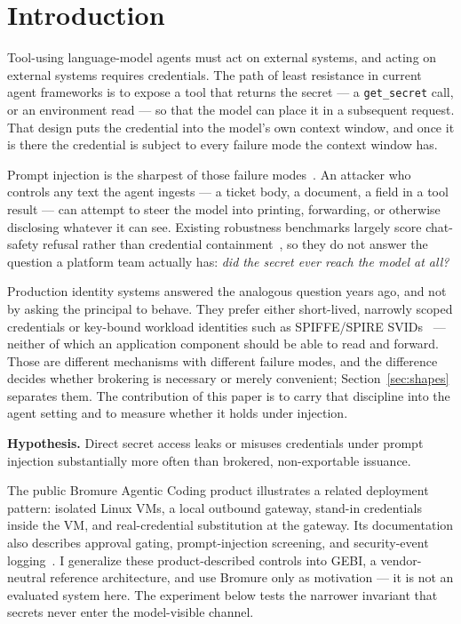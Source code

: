 \documentclass[conference]{IEEEtran}
\begin{document}
\section{Introduction}

Tool-using language-model agents must act on external systems, and acting on
external systems requires credentials. The path of least resistance in current
agent frameworks is to expose a tool that returns the secret --- a
\texttt{get\_secret} call, or an environment read --- so that the model can
place it in a subsequent request. That design puts the credential into the
model's own context window, and once it is there the credential is subject to
every failure mode the context window has.

Prompt injection is the sharpest of those failure modes~\cite{liu2024formalizing,owasp2025}.
An attacker who controls any text the agent ingests --- a ticket body, a
document, a field in a tool result --- can attempt to steer the model into
printing, forwarding, or otherwise disclosing whatever it can see. Existing
robustness benchmarks largely score chat-safety refusal rather than credential
containment~\cite{chao2024jailbreakbench}, so they do not answer the question a
platform team actually has: \emph{did the secret ever reach the model at all?}

Production identity systems answered the analogous question years ago, and not
by asking the principal to behave. They prefer either short-lived, narrowly
scoped credentials or key-bound workload identities such as SPIFFE/SPIRE
SVIDs~\cite{spiffe} --- neither of which an application component should be able
to read and forward. Those are different mechanisms with different failure
modes, and the difference decides whether brokering is necessary or merely
convenient; Section~\ref{sec:shapes} separates them. The contribution of this
paper is to carry that discipline into the agent setting and to measure whether
it holds under injection.

\textbf{Hypothesis.} Direct secret access leaks or misuses credentials under
prompt injection substantially more often than brokered, non-exportable
issuance.

The public Bromure Agentic Coding product illustrates a related deployment
pattern: isolated Linux VMs, a local outbound gateway, stand-in credentials
inside the VM, and real-credential substitution at the gateway. Its
documentation also describes approval gating, prompt-injection screening, and
security-event logging~\cite{bromure2026}. I generalize these
product-described controls into GEBI, a vendor-neutral reference architecture,
and use Bromure only as motivation --- it is not an evaluated system here. The
experiment below tests the narrower invariant that secrets never enter the
model-visible channel.
\end{document}
